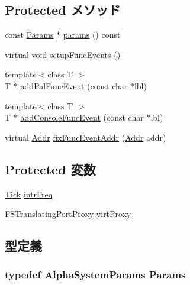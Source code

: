 \subsection*{Protected メソッド}
\begin{DoxyCompactItemize}
\item 
const \hyperlink{classAlphaSystem_a2af24d7a564ee2ca81332fb46406cbe5}{Params} $\ast$ \hyperlink{classAlphaSystem_acd3c3feb78ae7a8f88fe0f110a718dff}{params} () const 
\item 
virtual void \hyperlink{classAlphaSystem_ae36115f702dd2f9ead5df8d632632cf7}{setupFuncEvents} ()
\item 
{\footnotesize template$<$class T $>$ }\\T $\ast$ \hyperlink{classAlphaSystem_aa8018ca1a248feeeefa3a4180d432490}{addPalFuncEvent} (const char $\ast$lbl)
\item 
{\footnotesize template$<$class T $>$ }\\T $\ast$ \hyperlink{classAlphaSystem_a144f0e3cc56a01c7425853cc5ad44021}{addConsoleFuncEvent} (const char $\ast$lbl)
\item 
virtual \hyperlink{classm5_1_1params_1_1Addr}{Addr} \hyperlink{classAlphaSystem_ac72b76fe05499c31c7091ec5a56c0d52}{fixFuncEventAddr} (\hyperlink{classm5_1_1params_1_1Addr}{Addr} addr)
\end{DoxyCompactItemize}
\subsection*{Protected 変数}
\begin{DoxyCompactItemize}
\item 
\hyperlink{base_2types_8hh_a5c8ed81b7d238c9083e1037ba6d61643}{Tick} \hyperlink{classAlphaSystem_a59830ff46622983eb3156d848aedd301}{intrFreq}
\item 
\hyperlink{classFSTranslatingPortProxy}{FSTranslatingPortProxy} \hyperlink{classAlphaSystem_a211e585d20649018ca8f1d7464b19db8}{virtProxy}
\end{DoxyCompactItemize}


\subsection{型定義}
\hypertarget{classAlphaSystem_a2af24d7a564ee2ca81332fb46406cbe5}{
\subsubsection[{Params}]{\setlength{\rightskip}{0pt plus 5cm}typedef AlphaSystemParams {\bf Params}}}
\label{classAlphaSystem_a2af24d7a564ee2ca81332fb46406cbe5}


